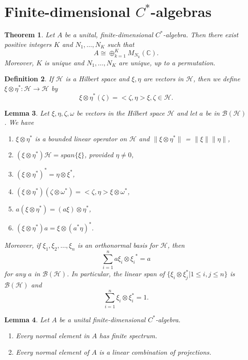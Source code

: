 \documentclass{book}
\newtheorem{definition}{Definition}[section]
\newtheorem{lemma}[definition]{Lemma}
\newtheorem{theorem}[definition]{Theorem}
\def\cstar{\(C^*\)-algebra}
\begin{document}
\section{Finite-dimensional \texorpdfstring{\(C^*\)}{C*}-algebras}\label{sec:17}
\begin{theorem}\label{theorem:171}
  Let \(A\) be a unital, finite-dimensional \cstar. Then
  there exist positive integers \(K\) and \(N_1,\ldots,N_K\) such that
  \[
    A\cong\oplus_{k=1}^K M_{N_k}(\mathbb{C}).
  \]
  Moreover, \(K\) is unique and \(N_1,\ldots,N_K\) are unique, up to a permutation.
\end{theorem}
\begin{definition}
  If \(\mathcal{H}\) is a Hilbert space and \(\xi,\eta\) are vectors in \(\mathcal{H}\), then we
  define \(\xi \otimes\eta^* : \mathcal{H}\rightarrow\mathcal{H}\) by
  \[
    \xi \otimes \eta^*(\zeta) = < \zeta,\eta > \xi,\zeta \in \mathcal{H}.
  \]
\end{definition}
\begin{lemma}
  Let \(\xi,\eta,\zeta,\omega\) be vectors in the Hilbert space \(\mathcal{H}\) and let \(a\) be in
  \(\mathcal{B}(\mathcal{H})\). We have
  \begin{enumerate}
    \item \(\xi \otimes \eta^*\) is a bounded linear operator on \(\mathcal{H}\) and \(\|\xi \otimes \eta^*\|\) = \(\|\xi\|\|\eta\|\),
    \item \((\xi \otimes \eta^*)\mathcal{H} = span\{\xi\}\), provided \(\eta\neq 0\),
    \item \({(\xi \otimes \eta^*)}^* = \eta \otimes \xi^*\),
    \item \((\xi \otimes \eta^*)(\zeta \otimes\omega^*) =< \zeta,\eta > \xi \otimes \omega^*\),
    \item \(a(\xi \otimes \eta^*) = (a\xi)\otimes \eta^*\),
    \item \((\xi \otimes \eta^*)a = \xi \otimes{(a^*\eta)}^*\).
  \end{enumerate}
  Moreover, if \(\xi_1,\xi_2,\ldots,\xi_n\) is an orthonormal basis for \(\mathcal{H}\), then
  \[
    \sum_{i=1}^{n} a\xi_i \otimes {\xi_i}^*=a
  \]
  for any \(a\) in \(\mathcal{B}(\mathcal{H})\). In particular, the linear span of 
  \(\{\xi_i \otimes \xi^*_j | 1 \leq i,j \leq n\}\) is \(\mathcal{B}(\mathcal{H})\) and
  \[
    \sum_{i=1}^{n}\xi_i \otimes\xi_i^* = 1.
  \]
\end{lemma}
\begin{lemma}
  Let \(A\) be a unital finite-dimensional \cstar.
\begin{enumerate}
  \item Every normal element in \(A\) has finite spectrum.
  \item Every normal element of \(A\) is a linear combination of projections.
\end{enumerate}
\end{lemma}
\end{document}
